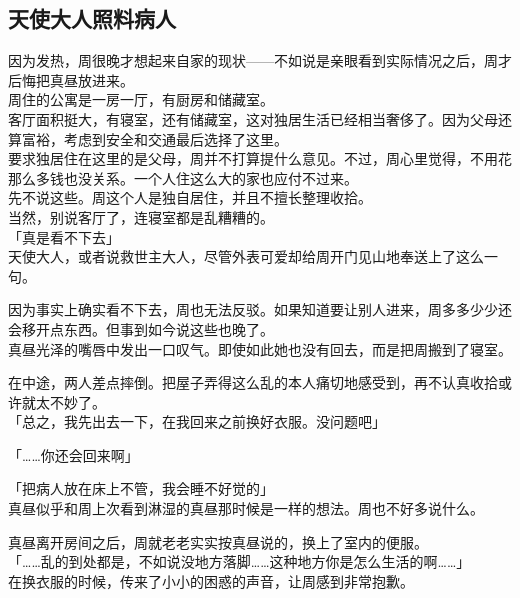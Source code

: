 \subsection{天使大人照料病人}

因为发热，周很晚才想起来自家的现状——不如说是亲眼看到实际情况之后，周才后悔把真昼放进来。\\

周住的公寓是一房一厅，有厨房和储藏室。\\

客厅面积挺大，有寝室，还有储藏室，这对独居生活已经相当奢侈了。因为父母还算富裕，考虑到安全和交通最后选择了这里。\\

要求独居住在这里的是父母，周并不打算提什么意见。不过，周心里觉得，不用花那么多钱也没关系。一个人住这么大的家也应付不过来。\\

先不说这些。周这个人是独自居住，并且不擅长整理收拾。\\

当然，别说客厅了，连寝室都是乱糟糟的。\\

「真是看不下去」\\

天使大人，或者说救世主大人，尽管外表可爱却给周开门见山地奉送上了这么一句。

因为事实上确实看不下去，周也无法反驳。如果知道要让别人进来，周多多少少还会移开点东西。但事到如今说这些也晚了。\\

真昼光泽的嘴唇中发出一口叹气。即使如此她也没有回去，而是把周搬到了寝室。

在中途，两人差点摔倒。把屋子弄得这么乱的本人痛切地感受到，再不认真收拾或许就太不妙了。\\

「总之，我先出去一下，在我回来之前换好衣服。没问题吧」

「……你还会回来啊」

「把病人放在床上不管，我会睡不好觉的」\\

真昼似乎和周上次看到淋湿的真昼那时候是一样的想法。周也不好多说什么。

真昼离开房间之后，周就老老实实按真昼说的，换上了室内的便服。\\

「……乱的到处都是，不如说没地方落脚……这种地方你是怎么生活的啊……」\\

在换衣服的时候，传来了小小的困惑的声音，让周感到非常抱歉。\\

